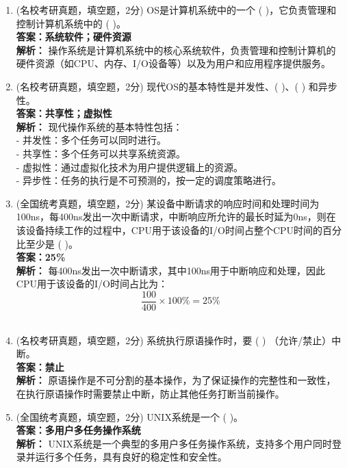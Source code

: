 \documentclass[lang=cn,newtx,10pt,scheme=chinese]{../../elegantbook}
\begin{document}
\begin{enumerate}
    \item (名校考研真题，填空题，2分) OS是计算机系统中的一个 (    )，它负责管理和控制计算机系统中的 (    )。\\
    \textbf{答案：系统软件；硬件资源}\\
    \textbf{解析：} 操作系统是计算机系统中的核心系统软件，负责管理和控制计算机的硬件资源（如CPU、内存、I/O设备等）以及为用户和应用程序提供服务。\\
    
    \item (名校考研真题，填空题，2分) 现代OS的基本特性是并发性、(    )、(    ) 和异步性。\\
    \textbf{答案：共享性；虚拟性}\\
    \textbf{解析：} 现代操作系统的基本特性包括：\\
    - 并发性：多个任务可以同时进行。\\
    - 共享性：多个任务可以共享系统资源。\\
    - 虚拟性：通过虚拟化技术为用户提供逻辑上的资源。\\
    - 异步性：任务的执行是不可预测的，按一定的调度策略进行。\\
    
    \item (全国统考真题，填空题，2分) 某设备中断请求的响应时间和处理时间为100ns，每400ns发出一次中断请求，中断响应所允许的最长时延为0ns，则在该设备持续工作的过程中，CPU用于该设备的I/O时间占整个CPU时间的百分比至少是 (    )。\\
    \textbf{答案：25\%}\\
    \textbf{解析：} 每400ns发出一次中断请求，其中100ns用于中断响应和处理，因此CPU用于该设备的I/O时间占比为：\\
    \[
    \frac{100}{400} \times 100\% = 25\%
    \]\\
    
    \item (名校考研真题，填空题，2分) 系统执行原语操作时，要 (    ) （允许/禁止）中断。\\
    \textbf{答案：禁止}\\
    \textbf{解析：} 原语操作是不可分割的基本操作，为了保证操作的完整性和一致性，在执行原语操作时需要禁止中断，防止其他任务打断当前操作。\\
    
    \item (全国统考真题，填空题，2分) UNIX系统是一个 (    )。\\
    \textbf{答案：多用户多任务操作系统}\\
    \textbf{解析：} UNIX系统是一个典型的多用户多任务操作系统，支持多个用户同时登录并运行多个任务，具有良好的稳定性和安全性。\\
    

\end{enumerate}
\end{document}
